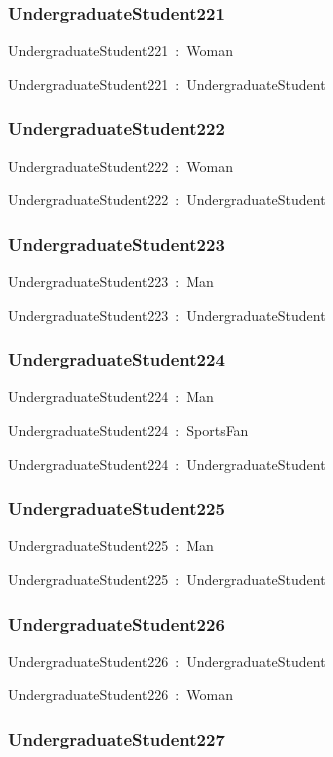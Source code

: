 \documentclass{article}
\begin{document}
\subsubsection*{UndergraduateStudent221}

UndergraduateStudent221~:~Woman

UndergraduateStudent221~:~UndergraduateStudent

\subsubsection*{UndergraduateStudent222}

UndergraduateStudent222~:~Woman

UndergraduateStudent222~:~UndergraduateStudent

\subsubsection*{UndergraduateStudent223}

UndergraduateStudent223~:~Man

UndergraduateStudent223~:~UndergraduateStudent

\subsubsection*{UndergraduateStudent224}

UndergraduateStudent224~:~Man

UndergraduateStudent224~:~SportsFan

UndergraduateStudent224~:~UndergraduateStudent

\subsubsection*{UndergraduateStudent225}

UndergraduateStudent225~:~Man

UndergraduateStudent225~:~UndergraduateStudent

\subsubsection*{UndergraduateStudent226}

UndergraduateStudent226~:~UndergraduateStudent

UndergraduateStudent226~:~Woman

\subsubsection*{UndergraduateStudent227}
\end{document}
